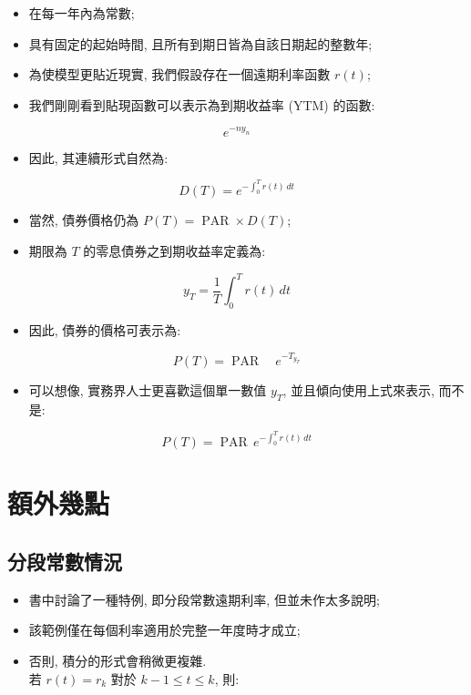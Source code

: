 \documentclass[letterpaper]{article}
\begin{document}
		\begin{itemize}
			\item 在每一年內為常數; 
			\item 具有固定的起始時間, 且所有到期日皆為自該日期起的整數年; 
			\item 為使模型更貼近現實, 我們假設存在一個遠期利率函數 $r (t) $; 
			\item 我們剛剛看到貼現函數可以表示為到期收益率 (YTM) 的函數: 
		\end{itemize}
		
		$$
		e^{-n y_{n}}
		$$
		
		\begin{itemize}
			\item 因此, 其連續形式自然為: 
		\end{itemize}
		
		$$
		D (T) = e^{-\int_{0}^{T} r (t) \, dt}
		$$
		
		\begin{itemize}
			\item 當然, 債券價格仍為 $P (T) = \operatorname{PAR} \times D (T) $; 
			\item 期限為 $T$ 的零息債券之到期收益率定義為: 
		\end{itemize}
		
		$$
		y_{T} = \frac{1}{T} \int_{0}^{T} r (t) \, dt
		$$
		
		\begin{itemize}
			\item 因此, 債券的價格可表示為: 
		\end{itemize}
		
		$$
		P (T) =\operatorname{PAR} \quad e^{-T_{y_{T}}}
		$$
		
		\begin{itemize}
			\item 可以想像, 實務界人士更喜歡這個單一數值 $y_{T}$, 並且傾向使用上式來表示, 而不是: 
		\end{itemize}
		
		$$
		P (T) = \operatorname{PAR} \, e^{-\int_{0}^{T} r (t) \, dt}
		$$
		
		\section{額外幾點}
		\subsection{分段常數情況}
		\begin{itemize}
			\item 書中討論了一種特例, 即分段常數遠期利率, 但並未作太多說明; 
			\item 該範例僅在每個利率適用於完整一年度時才成立; 
			\item 否則, 積分的形式會稍微更複雜.  \\
			若 $r (t) = r_{k}$ 對於 $k - 1 \leq t \leq k$, 則: 
		\end{itemize}
		
\end{document}
